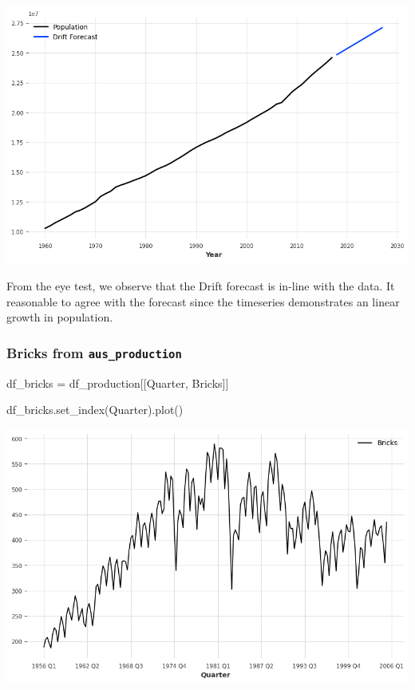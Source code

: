 \documentclass[
  11pt,
]{article}
\newenvironment{Shaded}{\begin{snugshade}}{\end{snugshade}}
\newcommand{\NormalTok}[1]{\textcolor[rgb]{0.00,0.23,0.31}{#1}}
\newcommand{\OperatorTok}[1]{\textcolor[rgb]{0.37,0.37,0.37}{#1}}
\newcommand{\StringTok}[1]{\textcolor[rgb]{0.13,0.47,0.30}{#1}}
\begin{document}
\includegraphics{hw3_files/figure-pdf/cell-9-output-1.png}

From the eye test, we observe that the Drift forecast is in-line with
the data. It reasonable to agree with the forecast since the timeseries
demonstrates an linear growth in population.

\subsubsection{\texorpdfstring{Bricks from
\texttt{aus\_production}}{Bricks from aus\_production}}\label{bricks-from-aus_production}

\begin{Shaded}
\begin{Highlighting}[]
\NormalTok{df\_bricks }\OperatorTok{=}\NormalTok{ df\_production[[}\StringTok{\textquotesingle{}Quarter\textquotesingle{}}\NormalTok{, }\StringTok{\textquotesingle{}Bricks\textquotesingle{}}\NormalTok{]]}
\end{Highlighting}
\end{Shaded}

\begin{Shaded}
\begin{Highlighting}[]
\NormalTok{df\_bricks.set\_index(}\StringTok{\textquotesingle{}Quarter\textquotesingle{}}\NormalTok{).plot()}
\end{Highlighting}
\end{Shaded}

\includegraphics{hw3_files/figure-pdf/cell-11-output-1.png}
\end{document}
